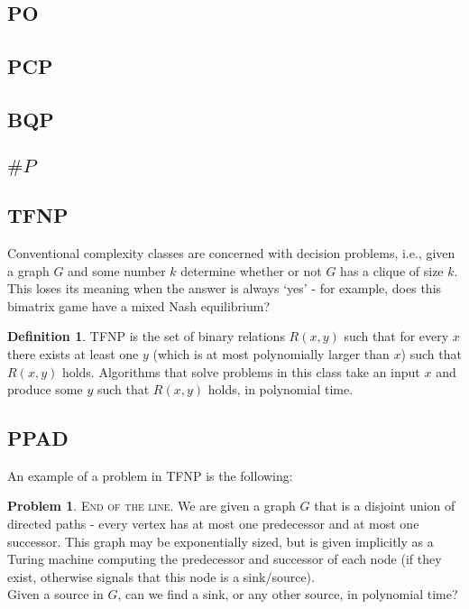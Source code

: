 \documentclass[]{article}
\theoremstyle{definition}
\newtheorem{definition}{Definition}[section]
\newtheorem{problem}{Problem}[section]
\begin{document}
\subsection{PO}

\subsection{PCP}

\subsection{BQP}

\subsection{$\# P$}
\fi
\subsection{TFNP}
Conventional complexity classes are concerned with decision problems, i.e., given a graph $G$ and some number $k$ determine whether or not $G$ has a clique of size $k$.\\
This loses its meaning when the answer is always `yes' - for example, does this bimatrix game have a mixed Nash equilibrium?\\
\begin{definition}
	TFNP is the set of binary relations $R(x, y)$ such that for every $x$ there exists at least one $y$ (which is at most polynomially larger than $x$) such that $R(x,y)$ holds.
	Algorithms that solve problems in this class take an input $x$ and produce some $y$ such that $R(x, y)$ holds, in polynomial time.
\end{definition}

\subsection{PPAD}
An example of a problem in TFNP is the following:
\begin{problem}
	\textsc{End of the line.} We are given a graph $G$ that is a disjoint union of directed paths - every vertex has at most one predecessor and at most one successor. This graph may be exponentially sized,
	but is given implicitly as a Turing machine computing the predecessor and successor of each node (if they exist, otherwise signals that this node is a sink/source).\\
	Given a source in $G$, can we find a sink, or any other source, in polynomial time?
\end{problem}
\end{document}

